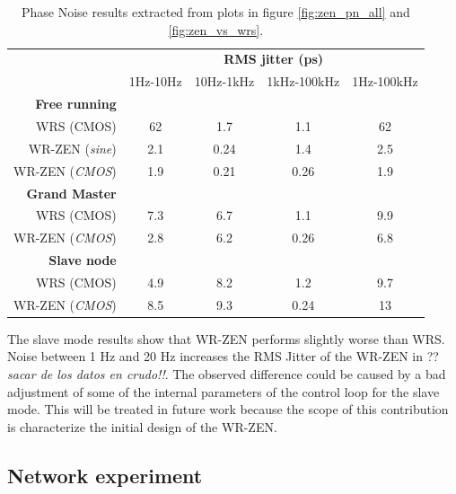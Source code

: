  \begin{table}\centering
     \begin{tabular}{@{} rcccc@{}}%
         & \multicolumn{4}{c}{\bfseries{RMS jitter (ps)}} \\
         \cmidrule(l){2-5}
         & 1Hz-10Hz & 10Hz-1kHz & 1kHz-100kHz  & 1Hz-100kHz \\ \midrule
         \textbf{Free running}\\
         \small{WRS (CMOS)}             & 62  & 1.7  & 1.1  & 62  \\
         \small{WR-ZEN (\textit{sine})} & 2.1 & 0.24 & 1.4  & 2.5 \\
         \small{WR-ZEN (\textit{CMOS})} & 1.9 & 0.21 & 0.26 & 1.9 \\
         \cmidrule(l){2-5}
         
         \textbf{Grand Master}\\
         \small{WRS (CMOS)}             & 7.3 & 6.7 & 1.1 & 9.9\\
         \small{WR-ZEN (\textit{CMOS})} & 2.8 & 6.2 & 0.26 & 6.8\\
         \cmidrule(l){2-5}
         
         \textbf{Slave node}\\
         \small{WRS (CMOS)}             & 4.9 & 8.2 & 1.2  & 9.7\\
         \small{WR-ZEN (\textit{CMOS})} & 8.5 & 9.3 & 0.24 & 13\\
         
         \bottomrule
        \end{tabular}
        \caption{Phase Noise results extracted from plots in figure \ref{fig:zen_pn_all} and \ref{fig:zen_vs_wrs}.}
        \label{tab:pn_results}
\end{table}

The slave mode results show that WR-ZEN performs slightly worse than WRS. Noise between 1 Hz and 20 Hz increases the RMS Jitter of the WR-ZEN in ?? \textit{sacar de los datos en crudo!!}. The observed difference could be caused by a bad adjustment of some of the internal parameters of the control loop for the slave mode. This will be treated in future work because the scope of this contribution is characterize the initial design of the WR-ZEN.

\subsection{Network experiment} %
\label{subsec: net_exp}

